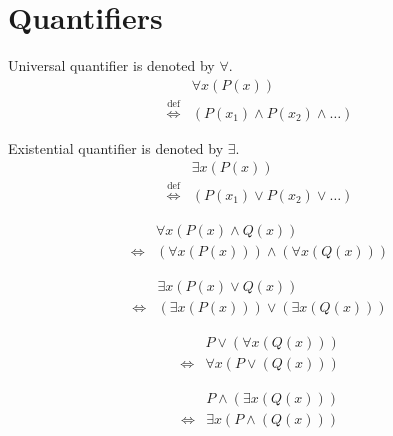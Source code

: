 \section{Quantifiers}
\begin{defn}
Universal quantifier is denoted by $\forall$.
\begin{align*}
& \forall x (P(x)) \\
\overset{\operatorname{def}}{\iff} & (P(x_1) \land P(x_2) \land \dots)
\end{align*}
\end{defn}

\begin{defn}
Existential quantifier is denoted by $\exists$.
\begin{align*}
& \exists x (P(x)) \\
\overset{\operatorname{def}}{\iff} & (P(x_1) \lor P(x_2) \lor \dots)
\end{align*}
\end{defn}

\begin{prop}
\label{Proposition:forall_land_commutativity}
\begin{align*}
& \forall x (P(x) \land Q(x)) \\
\iff & (\forall x (P(x))) \land (\forall x (Q(x)))
\end{align*}
\end{prop}

\begin{prop}
\label{Proposition:exists_lor_commutativity}
\begin{align*}
& \exists x (P(x) \lor Q(x)) \\
\iff & (\exists x (P(x))) \lor (\exists x (Q(x)))
\end{align*}
\end{prop}

\begin{prop}
\label{Proposition:lor_forall_distributivity}
\begin{align*}
& P \lor (\forall x (Q(x))) \\
\iff & \forall x (P \lor (Q(x)))
\end{align*}
\end{prop}

\begin{prop}
\label{Proposition:land_exists_distributivity}
\begin{align*}
& P \land (\exists x (Q(x))) \\
\iff & \exists x (P \land (Q(x)))
\end{align*}
\end{prop}

